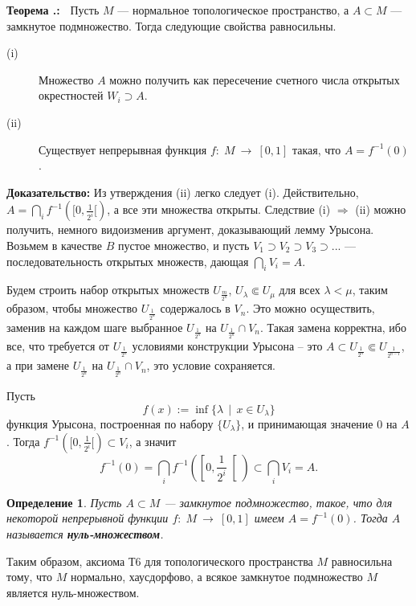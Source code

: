 \documentclass[12pt]{book}
\newcommand{\arrow}{{\:\longrightarrow\:}}
\def\endproof{\hbox{\vrule width 5pt height 5pt depth 0pt}}
\theoremstyle{upshape}
\theoremstyle{generic}
\newtheorem{opredelenie}[teorema]{Определение}
\def\еза{\end{remark}}
\theoremstyle{upshapenonumber}
\newcommand{\следствие}{%
     \refstepcounter{teorema}
     {\noindent\bf Следствие \thechapter.\arabic{teorema}:\ }}
\newcommand{\пример}{%
     \refstepcounter{teorema}
     {\noindent\bf Пример \thechapter.\arabic{teorema}:\ }}
\newcommand{\лемма}{%
     \refstepcounter{teorema}
     {\noindent\bf Лемма \thechapter.\arabic{teorema}:\ }}
\newcommand{\теорема}{%
     \refstepcounter{teorema}
     {\noindent\bf Теорема \thechapter.\arabic{teorema}:\ }}
\newcommand{\утверждение}{%
     \refstepcounter{teorema}
     {\noindent\bf Утверждение \thechapter.\arabic{teorema}:\ }}
\def\бф{\bf}
\def\ем{\em}
\def\ез{\end{zadacha}}
\def\еу{\end{ukazanie}}
\def\определение{\begin{opredelenie}}
\def\ео{\end{opredelenie}}
\def\енум{\begin{enumerate}}
\def\ее{\end{enumerate}}
\begin{document}
\hfill

\теорема\label{_T6_sche_Theorem_}
Пусть $M$ --- нормальное топологическое
пространство, а $A\subset M$ --- замкнутое подмножество.
Тогда следующие свойства равносильны.

\begin{description}
\item[(i)]
Множество $A$ можно получить как пересечение счетного числа
открытых  окрестностей $W_i \supset A$.
\item[(ii)] Существует непрерывная функция 
$f:\; M \arrow [0,1]$ такая, что $A = f^{-1}(0)$.
\end{description}

\noindent
{\bf Доказательство:}
Из утверждения (ii) легко следует (i).
Действительно, $A= \bigcap_i f^{-1}([0, \frac 1 {2^i}[)$,
а все эти множества открыты.
Следствие (i) $\Rightarrow$ (ii) можно получить, немного 
видоизменив аргумент, доказывающий лемму Урысона.
Возьмем в качестве $B$ пустое множество, и пусть
$V_1\supset V_2 \supset V_3 \supset ...$ --- последовательность
открытых множеств, дающая $\bigcap_i V_i =A$.

Будем строить набор открытых множеств
$U_{\frac m {2^n}}$, $U_\lambda\Subset U_\mu$ для всех
$\lambda <\mu$, таким образом, чтобы множество
$U_{\frac 1 {2^n}}$ содержалось в $V_n$.
Это можно осуществить, заменив на каждом шаге
выбранное $U_{\frac 1 {2^n}}$ 
на $U_{\frac 1 {2^n}}\cap V_n$. Такая замена
корректна, ибо все, что требуется от $U_{\frac 1 {2^n}}$
условиями конструкции Урысона
-- это $A \subset U_{\frac 1 {2^n}} \Subset U_{\frac 1 {2^{n-1}}}$,
а при замене $U_{\frac 1 {2^n}}$ 
на $U_{\frac 1 {2^n}}\cap V_n$, это условие сохраняется.

Пусть 
\[
f(x):= \inf \{ \lambda \ \ |\ \ x\in U_\lambda\} 
\]
функция Урысона, построенная по набору $\{U_\lambda\}$,
и принимающая значение 0 на $A$.
Тогда $f^{-1}([0, \frac 1 {2^i}[)\subset V_i$,
а значит 
\[ f^{-1}(0) = 
   \bigcap_i f^{-1}\left (\left[0, \frac 1{2^i}\right[\right)\subset \bigcap_i
   V_i = A.
\]
\endproof

\определение
Пусть $A\subset M$ --- замкнутое подмножество,
такое, что для некоторой непрерывной функции 
$f:\; M \arrow [0,1]$ имеем $A = f^{-1}(0)$.
Тогда $A$ называется {\бф нуль-множеством}.
\ео

Таким образом, аксиома Т6 для топологического
пространства $M$ равносильна тому, что $M$ нормально,
хаусдорфово, а всякое замкнутое подмножество $M$
является нуль-множеством.
\end{document}
